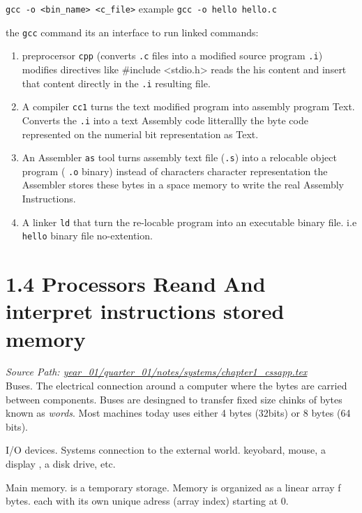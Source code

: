 \documentclass[11pt,a4paper]{report}
\begin{document}
\texttt{gcc -o \textless{}bin\_name\textgreater{} \textless{}c\_file\textgreater{}} example \texttt{gcc -o hello hello.c}

the \texttt{gcc} command its an interface to run linked commands:

\begin{enumerate}
  \item preprocersor \texttt{cpp} (converts \texttt{.c} files into a modified source program \texttt{.i}) modifies directives like \#include \textless{}stdio.h\textgreater{} reads the his content and insert that content directly in the \texttt{.i} resulting file.
  \item A compiler \texttt{cc1} turns the text modified program into assembly program Text. Converts the \texttt{.i} into a text Assembly code litterallly the byte code represented on the numerial bit representation as Text.
  \item An Assembler \texttt{as} tool turns assembly text file (\texttt{.s}) into a relocable object program ( \texttt{.o} binary) instead of characters character representation the Assembler stores these bytes in a space memory to write the real Assembly Instructions.
  \item A linker \texttt{ld} that turn the re-locable program into an executable binary file. i.e \texttt{hello} binary file no-extention.


\end{enumerate}
\section{1.4 Processors Reand And interpret instructions stored memory}
\noindent\textit{Source Path: \href{https://github.com/TEGDV/QuantitativeSystemsEngineering/blob/main/year_01/quarter_01/notes/systems/chapter1_cssapp.tex}{year\_01/quarter\_01/notes/systems/chapter1\_cssapp.tex}}\\



Buses. The electrical connection around a computer where the bytes are carried between components. Buses are desingned to transfer fixed size chinks of bytes known as \textit{words}. Most machines today uses either 4 bytes (32bits) or 8 bytes (64 bits).

I/O devices. Systems connection to the external world. keyobard, mouse, a display , a disk drive, etc.

Main memory. is a temporary storage. Memory is organized as a linear array f bytes. each with its own unique adress (array index) starting at 0.
\end{document}
